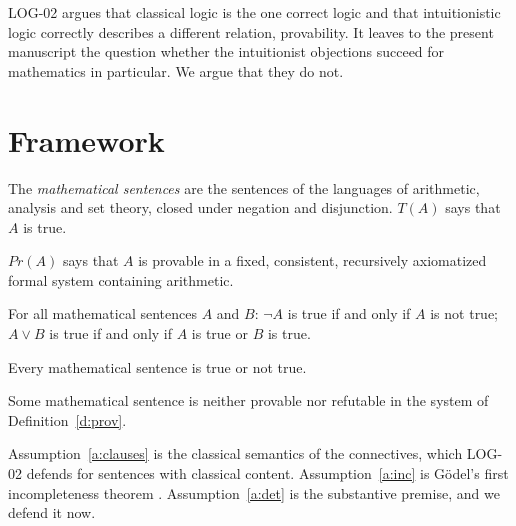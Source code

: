 \documentclass{situationist-preprint}
\begin{document}
LOG-02 argues that classical logic is the one correct logic and that intuitionistic logic correctly describes a different relation, provability. It leaves to the present manuscript the question whether the intuitionist objections succeed for mathematics in particular. We argue that they do not.

\section{Framework}

\begin{definition}\label{d:sent}
The \emph{mathematical sentences} are the sentences of the languages of arithmetic, analysis and set theory, closed under negation and disjunction. $T(A)$ says that $A$ is true.
\end{definition}

\begin{definition}[Provability]\label{d:prov}
$\mathit{Pr}(A)$ says that $A$ is provable in a fixed, consistent, recursively axiomatized formal system containing arithmetic.
\end{definition}

\begin{assumption}\label{a:clauses}
For all mathematical sentences $A$ and $B$: $\neg A$ is true if and only if $A$ is not true; $A \vee B$ is true if and only if $A$ is true or $B$ is true.
\end{assumption}

\begin{assumption}[Determinacy]\label{a:det}
Every mathematical sentence is true or not true.
\end{assumption}

\begin{assumption}[Incompleteness]\label{a:inc}
Some mathematical sentence is neither provable nor refutable in the system of Definition~\ref{d:prov}.
\end{assumption}

Assumption~\ref{a:clauses} is the classical semantics of the connectives, which LOG-02 defends for sentences with classical content. Assumption~\ref{a:inc} is Gödel's first incompleteness theorem \citep{Goedel1931}. Assumption~\ref{a:det} is the substantive premise, and we defend it now.
\end{document}
